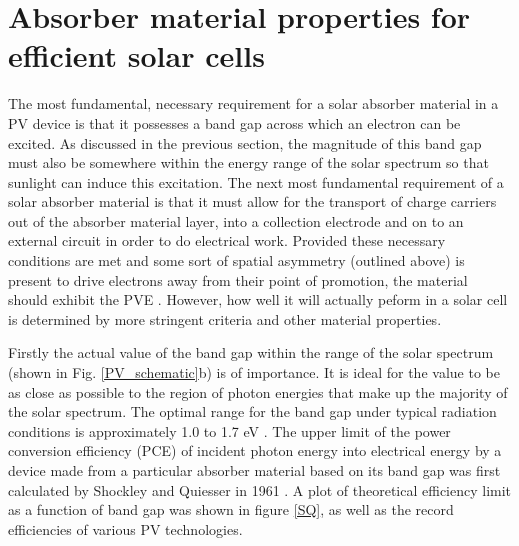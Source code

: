 \documentclass[11pt, twoside]{report}
\begin{document}
\section{Absorber material properties for efficient solar cells}\label{PV_properties}
The most fundamental, necessary requirement for a solar absorber material in a PV device is that it possesses a band gap across which an electron can be excited. As discussed in the previous section, the magnitude of this band gap must also be somewhere within the energy range of the solar spectrum so that sunlight can induce this excitation. The next most fundamental requirement of a solar absorber material is that it must allow for the transport of charge carriers out of the absorber material layer, into a collection electrode and on to an external circuit in order to do electrical work. Provided these necessary conditions are met and some sort of spatial asymmetry (outlined above) is present to drive electrons away from their point of promotion, the material should exhibit the PVE \cite{Nelson2}. However, how well it will actually peform in a solar cell is determined by more stringent criteria and other material properties. 

Firstly the actual value of the band gap within the range of the solar spectrum (shown in Fig. \ref{PV_schematic}b) is of importance. It is ideal for the value to be as close as possible to the region of photon energies that make up the majority of the solar spectrum. The optimal range for the band gap under typical radiation conditions is approximately 1.0 to 1.7 eV \cite{PV_E_range}. The upper limit of the power conversion efficiency (PCE) of incident photon energy into electrical energy by a device made from a particular absorber material based on its band gap was first calculated by Shockley and Quiesser in 1961 \cite{SQ_1961}. A plot of theoretical efficiency limit as a function of band gap was shown in figure \ref{SQ}, as well as the record efficiencies of various PV technologies.
\end{document}
